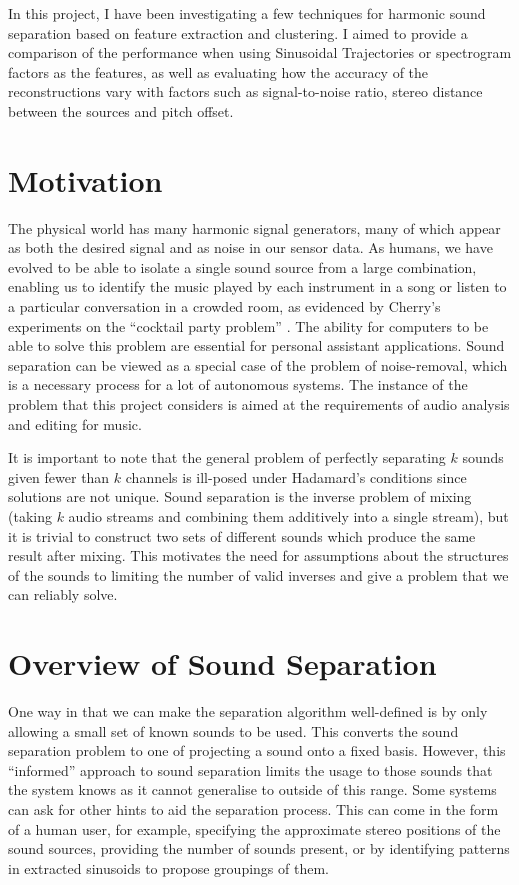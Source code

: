 \documentclass[10pt,twoside,a4paper]{report}
\begin{document}

In this project, I have been investigating a few techniques for harmonic sound separation based on feature extraction and clustering. I aimed to provide a comparison of the performance when using Sinusoidal Trajectories or spectrogram factors as the features, as well as evaluating how the accuracy of the reconstructions vary with factors such as signal-to-noise ratio, stereo distance between the sources and pitch offset.

\section{Motivation}

The physical world has many harmonic signal generators, many of which appear as both the desired signal and as noise in our sensor data. As humans, we have evolved to be able to isolate a single sound source from a large combination, enabling us to identify the music played by each instrument in a song or listen to a particular conversation in a crowded room, as evidenced by Cherry's experiments on the ``cocktail party problem'' \cite{cherry1953some}. The ability for computers to be able to solve this problem are essential for personal assistant applications. Sound separation can be viewed as a special case of the problem of noise-removal, which is a necessary process for a lot of autonomous systems. The instance of the problem that this project considers is aimed at the requirements of audio analysis and editing for music.

It is important to note that the general problem of perfectly separating $ k $ sounds given fewer than $ k $ channels is ill-posed under Hadamard's conditions \cite{hadamard1902problemes} since solutions are not unique. Sound separation is the inverse problem of mixing (taking $ k $ audio streams and combining them additively into a single stream), but it is trivial to construct two sets of different sounds which produce the same result after mixing. This motivates the need for assumptions about the structures of the sounds to limiting the number of valid inverses and give a problem that we can reliably solve.

\section{Overview of Sound Separation}

One way in that we can make the separation algorithm well-defined is by only allowing a small set of known sounds to be used. This converts the sound separation problem to one of projecting a sound onto a fixed basis. However, this ``informed'' approach to sound separation limits the usage to those sounds that the system knows as it cannot generalise to outside of this range. Some systems can ask for other hints to aid the separation process. This can come in the form of a human user, for example, specifying the approximate stereo positions of the sound sources, providing the number of sounds present, or by identifying patterns in extracted sinusoids to propose groupings of them.
\end{document}
